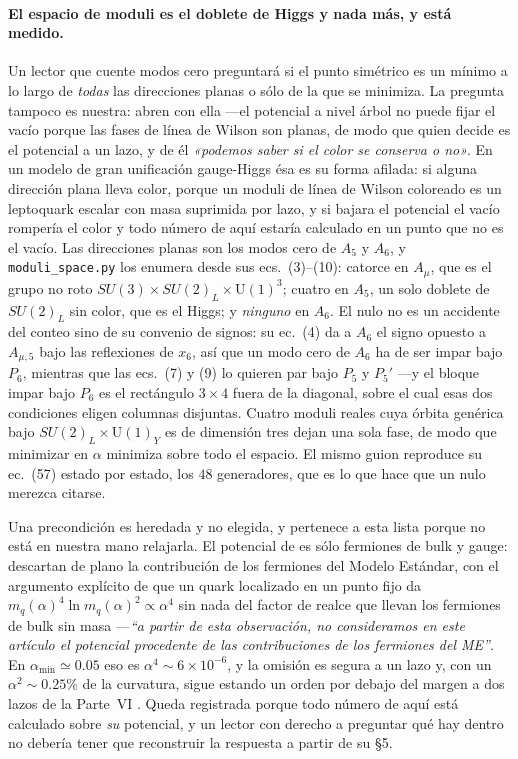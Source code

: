 \documentclass[11pt,a4paper]{article}
\newcommand{\su}[1]{SU(#1)}
\newcommand{\amin}{\alpha_{\min}}
\begin{document}
\paragraph{El espacio de moduli es el doblete de Higgs y nada más, y está medido.} Un lector que
cuente modos cero preguntará si el punto simétrico es un mínimo a lo largo de \emph{todas} las
direcciones planas o sólo de la que se minimiza. La pregunta tampoco es nuestra: \cite{HY04} abren
con ella ---el potencial a nivel árbol no puede fijar el vacío porque las fases de línea de Wilson
son planas, de modo que quien decide es el potencial a un lazo, y de él \emph{«podemos saber si el
color se conserva o no»}. En un modelo de gran unificación gauge-Higgs ésa es su forma afilada: si
alguna dirección plana lleva color, porque un moduli de línea de Wilson
coloreado es un leptoquark escalar con masa suprimida por lazo, y si bajara el potencial el vacío
rompería el color y todo número de aquí estaría calculado en un punto que no es el vacío. Las
direcciones planas son los modos cero de $A_5$ y $A_6$, y \texttt{moduli\_\allowbreak space.py} los
enumera desde sus ecs.~(3)--(10): catorce en $A_\mu$, que es el grupo no roto
$\su3\times\su2_L\times\mathrm{U}(1)^3$; cuatro en $A_5$, un solo doblete de $\su2_L$ sin color, que
es el Higgs; y \emph{ninguno} en $A_6$. El nulo no es un accidente del conteo sino de su convenio de
signos: su ec.~(4) da a $A_6$ el signo opuesto a $A_{\mu,5}$ bajo las reflexiones de $x_6$, así que
un modo cero de $A_6$ ha de ser impar bajo $P_6$, mientras que las ecs.~(7) y (9) lo quieren par
bajo $P_5$ y $P_5'$ ---y el bloque impar bajo $P_6$ es el rectángulo $3\times4$ fuera de la
diagonal, sobre el cual esas dos condiciones eligen columnas disjuntas. Cuatro moduli reales cuya
órbita genérica bajo $\su2_L\times\mathrm{U}(1)_Y$ es de dimensión tres dejan una sola fase, de modo
que minimizar en $\alpha$ minimiza sobre todo el espacio. El mismo guion reproduce su ec.~(57)
estado por estado, los $48$ generadores, que es lo que hace que un nulo merezca citarse.

Una precondición es heredada y no elegida, y pertenece a esta lista porque no está en nuestra mano
relajarla. El potencial de \cite{KM25} es sólo fermiones de bulk y gauge: descartan de plano la
contribución de los fermiones del Modelo Estándar, con el argumento explícito de que un quark
localizado en un punto fijo da $m_q(\alpha)^4\ln m_q(\alpha)^2\propto\alpha^4$ sin nada del factor de
realce que llevan los fermiones de bulk sin masa ---\emph{``a partir de esta observación, no
consideramos en este artículo el potencial procedente de las contribuciones de los fermiones del
ME''}. En $\amin\simeq0.05$ eso es $\alpha^4\sim 6\times10^{-6}$, y la omisión es segura a un lazo y,
con un $\alpha^2\sim0.25\%$ de la curvatura, sigue estando un orden por debajo del margen a dos
lazos de la Parte~VI \cite{PartVI}. Queda registrada porque todo número de aquí está calculado sobre
\emph{su} potencial, y un lector con derecho a preguntar qué hay dentro no debería tener que
reconstruir la respuesta a partir de su §5.
\end{document}
